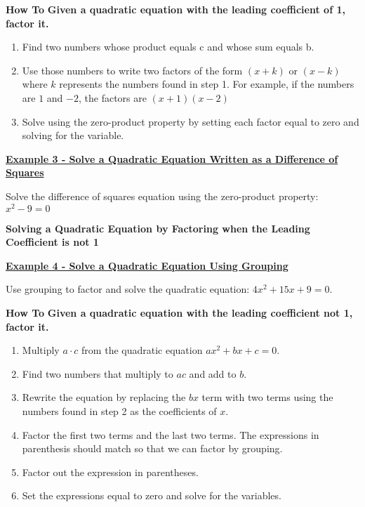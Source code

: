 \documentclass[12pt]{book}
\begin{document}
\vspace{3mm}
    \begin{boxR}
     \textbf{How To}
    \vspace{1mm}
    \hline
    \vspace{2mm}
  \textbf{Given a quadratic equation with the leading coefficient of 1, factor it.} 
  \begin{enumerate}
      \item Find two numbers whose product equals c and whose sum equals b.
      \item Use those numbers to write two factors of the form $(x+k)$ or $(x-k)$ where $k$ represents the numbers found in step 1. For example, if the numbers are $1$ and $-2$, the factors are $(x+1)(x-2)$
      \item Solve using the zero-product property by setting each factor equal to zero and solving for the variable.
  \end{enumerate}
\end{boxR}
\vspace{3mm}


\underline{\textbf{Example 3 - Solve a Quadratic Equation Written as a Difference of Squares}}

Solve the difference of squares equation using the zero-product property:  $x^2-9=0$

\vspace{50mm}
\textbf{Solving a Quadratic Equation by Factoring when the Leading Coefficient is not 1}

\vspace{1mm}

\underline{\textbf{Example 4 - Solve a Quadratic Equation Using Grouping}}

Use grouping to factor and solve the quadratic equation: $4x^2+15x+9=0$.


\newpage 
\begin{boxR}
 \textbf{How To}
    \vspace{1mm}
    \hline
    \vspace{2mm}
  \textbf{Given a quadratic equation with the leading coefficient \textbf{not} 1, factor it.} 
  \begin{enumerate}
      \item Multiply $a \cdot c$ from the quadratic equation $ax^2 +bx+c = 0$.
      \item Find two numbers that multiply to $ac$ and add to $b$.
      \item Rewrite the equation by replacing the $bx$ term with two terms using the numbers found in step 2 as the coefficients of $x$.
      \item Factor the first two terms and the last two terms. The expressions in parenthesis should match so that we can factor by grouping. 
      \item Factor out the expression in parentheses. 
      \item Set the expressions equal to zero and solve for the variables. 
  \end{enumerate}
\end{boxR}
\end{document}
